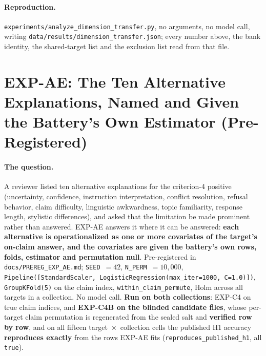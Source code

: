 \paragraph{Reproduction.} \texttt{experiments/analyze\_dimension\_transfer.py}, no arguments, no model call, writing \texttt{data/results/dimension\_transfer.json}; every number above, the bank identity, the shared-target list and the exclusion list read from that file.

\section{EXP-AE: The Ten Alternative Explanations, Named and Given the Battery's Own Estimator (Pre-Registered)}
\label{app:covariate_audit}

\paragraph{The question.} A reviewer listed ten alternative explanations for the criterion-4 positive (uncertainty, confidence, instruction interpretation, conflict resolution, refusal behavior, claim difficulty, linguistic awkwardness, topic familiarity, response length, stylistic differences), and asked that the limitation be made prominent rather than answered. EXP-AE answers it where it can be answered: \textbf{each alternative is operationalized as one or more covariates of the target's on-claim answer, and the covariates are given the battery's own rows, folds, estimator and permutation null}. Pre-registered in \texttt{docs/PREREG\_EXP\_AE.md}; \texttt{SEED}~$=42$, \texttt{N\_PERM}~$=10{,}000$, \texttt{Pipeline([StandardScaler, LogisticRegression(max\_iter=1000, C=1.0)])}, \texttt{GroupKFold(5)} on the claim index, \texttt{within\_claim\_permute}, Holm across all targets in a collection. No model call. \textbf{Run on both collections}: EXP-C4 on true claim indices, and \textbf{EXP-C4B on the blinded candidate files}, whose per-target claim permutation is regenerated from the sealed salt and \textbf{verified row by row}, and on all fifteen target~$\times$~collection cells the published H1 accuracy \textbf{reproduces exactly} from the rows EXP-AE fits (\texttt{reproduces\_published\_h1}, all \texttt{true}).

